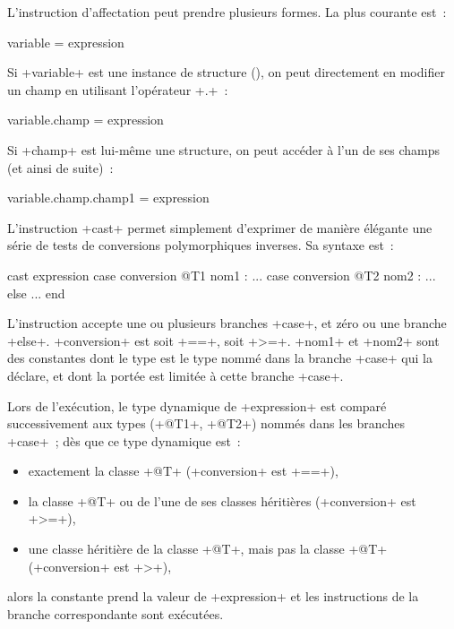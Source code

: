 
L'instruction d'affectation peut prendre plusieurs formes. La plus courante est~:

\begin{galgasbox}
variable = expression
\end{galgasbox}

Si \ggs+variable+ est une instance de structure (), on peut directement en modifier un champ en utilisant l'opérateur \ggs+.+~:

\begin{galgasbox}
variable.champ = expression
\end{galgasbox}

Si \ggs+champ+ est lui-même une structure, on peut accéder à l'un de ses champs (et ainsi de suite)~:

\begin{galgasbox}
variable.champ.champ1 = expression
\end{galgasbox}














L'instruction \ggs+cast+ permet simplement d'exprimer de manière élégante une série de tests de conversions polymorphiques inverses. Sa syntaxe est~:

\begin{galgasbox}
cast expression
case conversion @T1 nom1 :
  ...
case conversion @T2 nom2 :
  ...
else
  ...
end
\end{galgasbox}

L'instruction accepte une ou plusieurs branches \ggs+case+, et zéro ou une branche \ggs+else+. \ggs+conversion+ est soit \ggs+==+, soit \ggs+>=+. \ggs+nom1+ et \ggs+nom2+ sont des constantes dont le type est le type nommé dans la branche \ggs+case+ qui la déclare, et dont la portée est limitée à cette branche \ggs+case+.

Lors de l'exécution, le type dynamique de \ggs+expression+ est comparé successivement aux types (\ggs+@T1+, \ggs+@T2+) nommés dans les branches \ggs+case+~; dès que ce type dynamique est~:
\begin{itemize}
  \item exactement la classe \ggs+@T+ (\ggs+conversion+ est \ggs+==+), 
  \item la classe \ggs+@T+ ou de l'une de ses classes héritières (\ggs+conversion+ est \ggs+>=+),
  \item une classe héritière de la classe \ggs+@T+, mais pas la classe \ggs+@T+ (\ggs+conversion+ est \ggs+>+),
\end{itemize}
alors la constante prend la valeur de \ggs+expression+ et les instructions de la branche correspondante sont exécutées.


